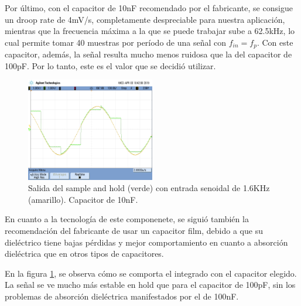 \documentclass{article}
\begin{document}
Por \'ultimo, con el capacitor de 10nF recomendado por el fabricante, se consigue un droop rate de 4mV/s, completamente despreciable para nuestra aplicaci\'on, mientras que la frecuencia m\'axima a la que se puede trabajar sube a 62.5kHz, lo cual permite tomar 40 muestras por per\'iodo de una se\~nal con $f_{in}=f_p$. Con este capacitor, adem\'as, la se\~nal resulta mucho menos ruidosa que la del capacitor de 100pF. Por lo tanto, este es el valor que se decidi\'o utilizar.

\begin{figure}[htb]     
	\centering     
	\includegraphics[width=0.5\textwidth]{sh/sh_10n.png}     
	\caption{Salida del sample and hold (verde) con entrada senoidal de 1.6KHz (amarillo). Capacitor de 10nF.}     	
	\label{fig:sh_10n} 
\end{figure}

En cuanto a la tecnolog\'ia de este componenete, se sigui\'o tambi\'en la recomendaci\'on del fabricante de usar un capacitor film, debido a que su diel\'ectrico tiene bajas p\'erdidas y mejor comportamiento en cuanto a absorci\'on diel\'ectrica que en otros tipos de capacitores.

En la figura \ref{fig:sh_10n}, se observa c\'omo se comporta el integrado con el capacitor elegido. La se\~nal se ve mucho m\'as estable en hold que para el capacitor de 100pF, sin los problemas de absorci\'on diel\'ectrica manifestados por el de 100nF.
\end{document}
